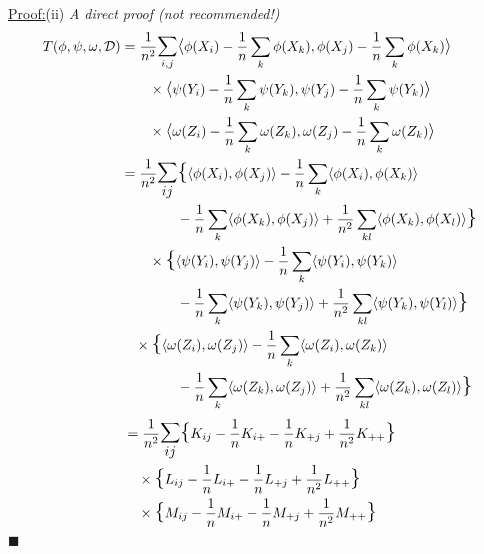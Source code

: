 \documentclass[12pt]{article}
\newenvironment{claimproof}[1]{\par\noindent\underline{Proof:}\space#1}{\hfill $\blacksquare$}
\numberwithin{claim}{section}
\numberwithin{lemma}{section}
\numberwithin{theorem}{section}
\begin{document}
\begin{claimproof}(ii) \emph{A direct proof (not recommended!)}
\begin{align*}
T(\phi,\psi,\omega,\mathcal{D}) &=
\frac{1}{n^2}\mathlarger{\sum}_{i,j}\mathlarger{\langle} \phi(X_i) - \frac{1}{n}\sum_k \phi(X_k), \phi(X_j) - \frac{1}{n}\sum_k \phi(X_k)  \mathlarger{\rangle}\\ & \quad \quad \times \mathlarger{\langle} \psi(Y_i) - \frac{1}{n}\sum_k \psi(Y_k), \psi(Y_j) - \frac{1}{n}\sum_k \psi(Y_k) \mathlarger{\rangle} \\ & \quad \quad  \times \mathlarger{\langle} \omega(Z_i) - \frac{1}{n}\sum_k \omega(Z_k), \omega(Z_j) - \frac{1}{n}\sum_k \omega(Z_k) \mathlarger{\rangle} \\
& = \frac{1}{n^2} \mathlarger{\mathlarger{\sum_{ij}}} \mathlarger{\mathlarger{\{}} \langle \phi(X_i),\phi(X_j)\rangle - \frac{1}{n} \sum_k \langle \phi(X_i),\phi(X_k)\rangle \\&\quad \quad \quad \quad- \frac{1}{n} \sum_k \langle \phi(X_k),\phi(X_j)\rangle +\frac{1}{n^2} \sum_{kl} \langle \phi(X_k),\phi(X_l)\rangle   \mathlarger{\mathlarger{\}}} \\
& \quad\quad \times \mathlarger{\mathlarger{\{}} \langle \psi(Y_i),\psi(Y_j)\rangle - \frac{1}{n} \sum_k \langle \psi(Y_i),\psi(Y_k)\rangle \\&\quad\quad\quad\quad- \frac{1}{n} \sum_k \langle \psi(Y_k),\psi(Y_j)\rangle +\frac{1}{n^2} \sum_{kl} \langle \psi(Y_k),\psi(Y_l)\rangle   \mathlarger{\mathlarger{\}}} \\
& \quad \times \mathlarger{\mathlarger{\{}} \langle \omega(Z_i),\omega(Z_j)\rangle - \frac{1}{n} \sum_k \langle \omega(Z_i),\omega(Z_k)\rangle \\&\quad\quad\quad\quad - \frac{1}{n} \sum_k \langle \omega(Z_k),\omega(Z_j)\rangle +\frac{1}{n^2} \sum_{kl} \langle \omega(Z_k),\omega(Z_l)\rangle   \mathlarger{\mathlarger{\}}} \\
\end{align*}
\begin{align*}
& = \frac{1}{n^2} \mathlarger{\mathlarger{\sum_{ij}}} \mathlarger{\mathlarger{\{}} K_{ij} - \frac{1}{n} K_{i+} - \frac{1}{n}K_{+j} +\frac{1}{n^2} K_{++}   \mathlarger{\mathlarger{\}}} \\
& \quad \times \mathlarger{\mathlarger{\{}} L_{ij} - \frac{1}{n} L_{i+} - \frac{1}{n}L_{+j} +\frac{1}{n^2} L_{++}   \mathlarger{\mathlarger{\}}} \\ 
& \quad \times \mathlarger{\mathlarger{\{}} M_{ij} - \frac{1}{n} M_{i+} - \frac{1}{n}M_{+j} +\frac{1}{n^2} M_{++}   \mathlarger{\mathlarger{\}}} \\ 

\end{align*}
\end{claimproof}
\end{document}
